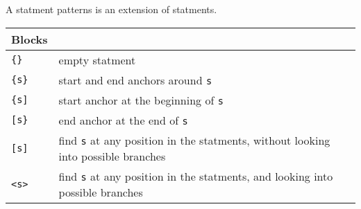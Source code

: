 
A statment patterns is an extension of statments.

\begin{tabular}{| l | l |}
  \hline
  Blocks & \\
  \hline
  \texttt{\{\}} & empty statment \\
  \texttt{\{s\}} & start and end anchors around \texttt{s} \\
  \texttt{\{s]} & start anchor at the beginning of \texttt{s} \\
  \texttt{[s\}} & end anchor at the end of \texttt{s} \\
  \texttt{[s]} & find \texttt{s} at any position in the statments, 
                 without looking into possible branches \\
  \texttt{<s>} & find \texttt{s} at any position in the statments, 
                 and looking into possible branches \\
  \hline
\end{tabular}

